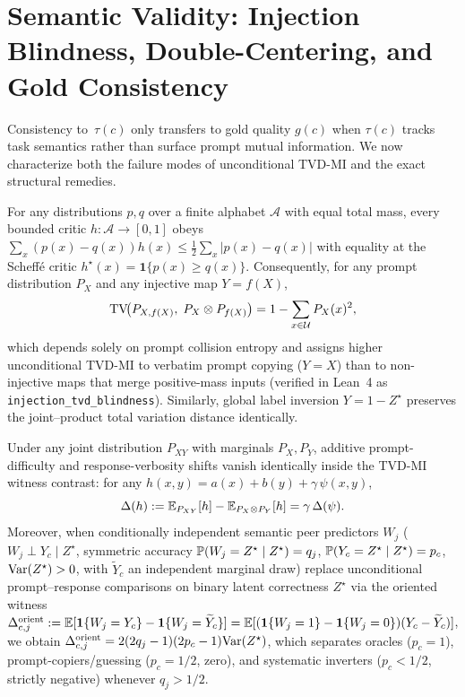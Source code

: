 \section{Semantic Validity: Injection Blindness, Double-Centering, and Gold Consistency}
\label{sec:gold}

Consistency to~$\tau(c)$ only transfers to gold quality $g(c)$ when $\tau(c)$
tracks task semantics rather than surface prompt mutual information. We now
characterize both the failure modes of unconditional TVD-MI and the exact
structural remedies.

\begin{theorem}
\label{thm:injection-blindness}
For any distributions $p, q$ over a finite alphabet $\mathcal{A}$ with equal
total mass, every bounded critic $h : \mathcal{A} \to [0,1]$ obeys
$\sum_x (p(x)-q(x))h(x) \le \frac{1}{2}\sum_x |p(x)-q(x)|$ with equality at the
Scheff\'e critic $h^\star(x) = \mathbf{1}\{p(x) \ge q(x)\}$. Consequently, for
any prompt distribution $P_X$ and any injective map $Y = f(X)$,
\begin{equation}
\label{eq:injection-blindness}
\mathrm{TV}\!\big(P_{X,f(X)},\; P_X \otimes P_{f(X)}\big)
= 1 - \sum_{x \in \mathcal{U}} P_X(x)^2,
\end{equation}
which depends solely on prompt collision entropy and assigns higher
unconditional TVD-MI to verbatim prompt copying ($Y = X$) than to non-injective
maps that merge positive-mass inputs (verified in Lean~4 as \texttt{injection\_tvd\_blindness}).
Similarly, global label inversion $Y = 1 - Z^\star$ preserves the joint--product
total variation distance identically.
\end{theorem}

\begin{theorem}
\label{thm:double-centering}
Under any joint distribution $P_{XY}$ with marginals $P_X, P_Y$, additive
prompt-difficulty and response-verbosity shifts vanish identically inside the
TVD-MI witness contrast: for any $h(x,y) = a(x) + b(y) + \gamma\,\psi(x,y)$,
\begin{equation}
\Delta(h) := \mathbb{E}_{P_{XY}}[h] - \mathbb{E}_{P_X \otimes P_Y}[h] = \gamma\,\Delta(\psi).
\end{equation}
Moreover, when conditionally independent semantic peer predictors $W_j$
($W_j \perp Y_c \mid Z^\star$, symmetric accuracy
$\mathbb{P}(W_j = Z^\star \mid Z^\star) = q_j$, $\mathbb{P}(Y_c=Z^\star\mid Z^\star)=p_c$, $\mathrm{Var}(Z^\star)>0$, with $\widetilde Y_c$ an independent marginal draw) replace unconditional
prompt--response comparisons on binary latent correctness $Z^\star$ via the
oriented witness
$\Delta^{\mathrm{orient}}_{c,j} := \mathbb{E}[\mathbf{1}\{W_j=Y_c\} - \mathbf{1}\{W_j=\widetilde{Y}_c\}] = \mathbb{E}[(\mathbf{1}\{W_j=1\}-\mathbf{1}\{W_j=0\})(Y_c - \widetilde{Y}_c)]$,
we obtain $\Delta^{\mathrm{orient}}_{c,j} = 2(2q_j - 1)(2p_c - 1)\mathrm{Var}(Z^\star)$,
which separates oracles ($p_c=1$), prompt-copiers/guessing ($p_c=1/2$, zero),
and systematic inverters ($p_c < 1/2$, strictly negative) whenever $q_j > 1/2$.
\end{theorem}

